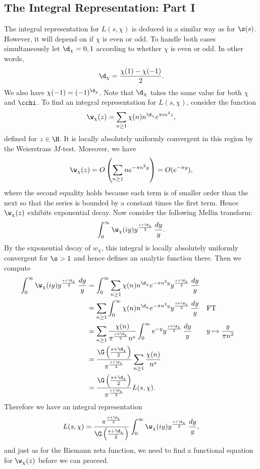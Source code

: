     \subsection*{The Integral Representation: Part I}
      The integral representation for $L(s,\chi)$ is deduced in a similar way as for $\z(s)$. However, it will depend on if $\chi$ is even or odd. To handle both cases simultaneously let $\d_{\chi} = 0,1$ according to whether $\chi$ is even or odd. In other words,
      \[
        \d_{\chi} = \frac{\chi(1)-\chi(-1)}{2}.
      \]
      We also have $\chi(-1) = (-1)^{\d_{\chi}}$. Note that $\d_{\chi}$ takes the same value for both $\chi$ and $\cchi$. To find an integral representation for $L(s,\chi)$, consider the function
      \[
        \w_{\chi}(z) = \sum_{n \ge 1}\chi(n)n^{\d_{\chi}}e^{\pi in^{2}z},
      \]
      defined for $z \in \H$. It is locally absolutely uniformly convergent in this region by the Weierstrass $M$-test. Moreover, we have
      \[
        \w_{\chi}(z) = O\left(\sum_{n \ge 1}ne^{-\pi n^{2}y}\right) = O(e^{-\pi y}),
      \]
      where the second equality holds because each term is of smaller order than the next so that the series is bounded by a constant times the first term. Hence $\w_{\chi}(z)$ exhibits exponential decay. Now consider the following Mellin transform:
      \[
        \int_{0}^{\infty}\w_{\chi}(iy)y^{\frac{s+\d_{\chi}}{2}}\,\frac{dy}{y}.
      \]
      By the exponential decay of $w_{\chi}$, this integral is locally absolutely uniformly convergent for $\s > 1$ and hence defines an analytic function there. Then we compute
      \begin{align*}
        \int_{0}^{\infty}\w_{\chi}(iy)y^{\frac{s+\d_{\chi}}{2}}\,\frac{dy}{y} &= \int_{0}^{\infty}\sum_{n \ge 1}\chi(n)n^{\d_{\chi}}e^{-\pi n^{2}y}y^{\frac{s+\d_{\chi}}{2}}\,\frac{dy}{y} \\
        &= \sum_{n \ge 1}\int_{0}^{\infty}\chi(n)n^{\d_{\chi}}e^{-\pi n^{2}y}y^{\frac{s+\d_{\chi}}{2}}\,\frac{dy}{y} && \text{FT} \\
        &= \sum_{n \ge 1}\frac{\chi(n)}{\pi^{\frac{s+\d_{\chi}}{2}}n^{s}}\int_{0}^{\infty}e^{-y}y^{\frac{s+\d_{\chi}}{2}}\,\frac{dy}{y} && \text{$y \mapsto \frac{y}{\pi n^{2}}$} \\
        &= \frac{\G\left(\frac{s+\d_{\chi}}{2}\right)}{\pi^{\frac{s+\d_{\chi}}{2}}}\sum_{n \ge 1}\frac{\chi(n)}{n^{s}} \\
        &= \frac{\G\left(\frac{s+\d_{\chi}}{2}\right)}{\pi^{\frac{s+\d_{\chi}}{2}}}L(s,\chi).
      \end{align*}
      Therefore we have an integral representation
      \begin{equation}\label{equ:integral_representation_Dirichlet_L-functions_1}
        L(s,\chi) = \frac{\pi^{\frac{s+\d_{\chi}}{2}}}{\G\left(\frac{s+\d_{\chi}}{2}\right)}\int_{0}^{\infty}\w_{\chi}(iy)y^{\frac{s+\d_{\chi}}{2}}\,\frac{dy}{y},
      \end{equation}
      and just as for the Riemann zeta function, we need to find a functional equation for $\w_{\chi}(z)$ before we can proceed.
